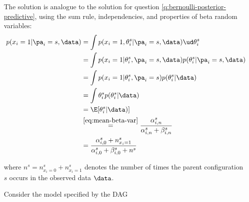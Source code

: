 \begin{exenumerate}
  \begin{solution}
    The solution is analogue to the solution for question
    \ref{q:bernoulli-posterior-predictive}, using the sum rule,
    independencies, and properties of beta random variables:
    \begin{align}
      p(x_i=1 |\pa_i=s, \data) &= \int p(x_i=1, \theta_i^s | \pa_i=s,
      \data) \ud \theta_i^s\\ & = \int p(x_i=1 | \theta_i^s, \pa_i=s,
      \data) p(\theta_i^s | \pa_i=s , \data)\\ & = \int p(x_i=1 |
      \theta_i^s, \pa_i=s) p(\theta_i^s | \data)\\ & = \int \theta_i^s
      p(\theta_i^s | \data)\\ & = \E[ \theta_i^s | \data)]\\ &
      \overset{\eqref{eq:mean-beta-var}}{=}
      \frac{\alpha_{i,n}^s}{\alpha_{i,n}^s+\beta_{i,n}^s}\\ & =
      \frac{\alpha_{i,0}^s+n^s_{x_i=1}}{\alpha_{i,0}^s+\beta_{i,0}^s+n^s}
      \label{eq:dgm-posterior-predictive}
    \end{align}
  \end{solution}
    where $n^s=n^s_{x_i=0}+n^s_{x_i=1}$ denotes the number of times
    the parent configuration $s$ occurs in the observed data $\data$.
    
\end{exenumerate}
  

Consider the model specified by the DAG

\begin{center}
\end{center}

